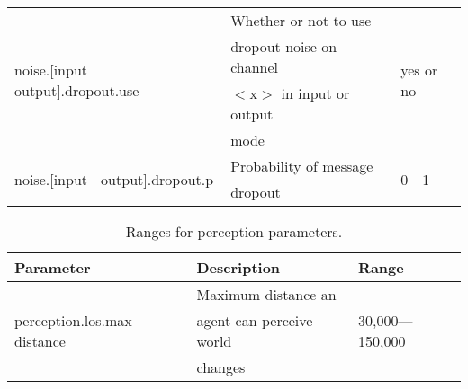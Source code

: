 \documentclass{article}
\begin{document}
\begin{table}[htb]
\begin{tabular}{lll}
  \multirow{4}{*}{noise.[input $|$ output].dropout.use} & Whether or not to use
                                        & \multirow{4}{*}{yes or no}\\
                                                        & dropout noise on
  channel                               & \\
                                                        & $<$x$>$ in input or
  output                                & \\
                                                        & mode                 
                                        & \\
  \hline
  \multirow{2}{*}{noise.[input $|$ output].dropout.p}   & Probability of message
                                        & \multirow{2}{*}{0---1}\\
                                                        & dropout              
                                        & \\
  \hline
\end{tabular}
\end{table}

\begin{table}[htb]
\caption{Ranges for perception parameters.}
\label{tab:8}
\centering
\begin{tabular}{lll}
  \hline
  \textbf{Parameter}                            & \textbf{Description}      & 
  \textbf{Range}\\
  \hline
  \multirow{3}{*}{perception.los.max-distance}  & Maximum distance an       & 
  \multirow{3}{*}{30,000---150,000}\\
                                                & agent can perceive world  & \\
                                                & changes                   & \\
  \hline
\end{tabular}
\end{table}
\end{document}
